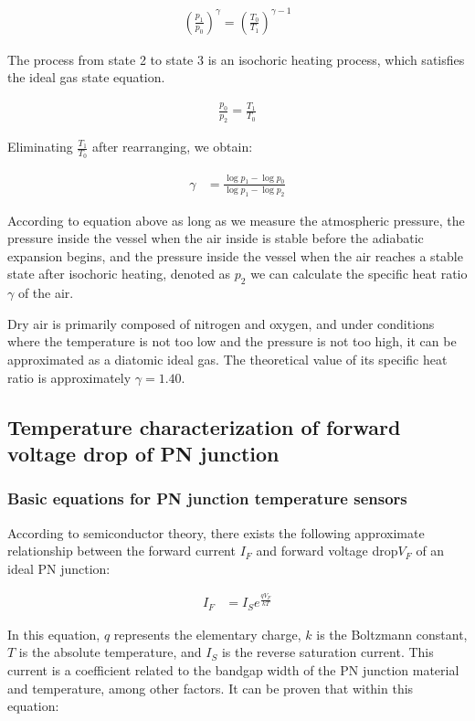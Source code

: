 \documentclass[UTF8]{article}
\begin{document}
	\begin{eqnarray}
	\left(\frac{p_{1}}{p_{0}}\right)^{\gamma}=\left(\frac{T_{0}}{T_{1}}\right)^{\gamma-1}
	\end{eqnarray}
   
   The process from state 2 to state 3 is an isochoric heating process, which satisfies the ideal gas state equation.
   
   \begin{eqnarray}
   \frac{p_{0}}{p_{2}}=\frac{T_{1}}{T_{0}}
   \end{eqnarray}
   
   Eliminating $\frac{T_1}{T_0}$  after rearranging, we obtain:
   
   \begin{eqnarray}
   \gamma & =\frac{\log p_{1}-\log p_{0}}{\log p_{1}-\log p_{2}}
   \end{eqnarray}
   
   According to equation above as long as we measure the atmospheric pressure, the pressure inside the vessel when the air inside is stable before the adiabatic expansion begins, and the pressure inside the vessel when the air reaches a stable state after isochoric heating, denoted as $p_2$ we can calculate the specific heat ratio $\gamma$ of the air.
   
   Dry air is primarily composed of nitrogen and oxygen, and under conditions where the temperature is not too low and the pressure is not too high, it can be approximated as a diatomic ideal gas. The theoretical value of its specific heat ratio is approximately $\gamma =1.40$.
   
   
   \subsection{Temperature characterization of forward voltage drop of PN junction}
   \subsubsection{Basic equations for PN junction temperature sensors}
   According to semiconductor theory, there exists the following approximate relationship between the forward current $I_F$ and forward voltage drop$ V_F$ of an ideal PN junction:
   
   \begin{eqnarray}
   I_{F} & =I_{S} e^{\frac{q V_{F}}{k T}}
   \end{eqnarray}
   
   In this equation, $q$ represents the elementary charge, $k$ is the Boltzmann constant, $T$ is the absolute temperature, and $I_S$ is the reverse saturation current. This current is a coefficient related to the bandgap width of the PN junction material and temperature, among other factors. It can be proven that within this equation:
   
\end{document}
